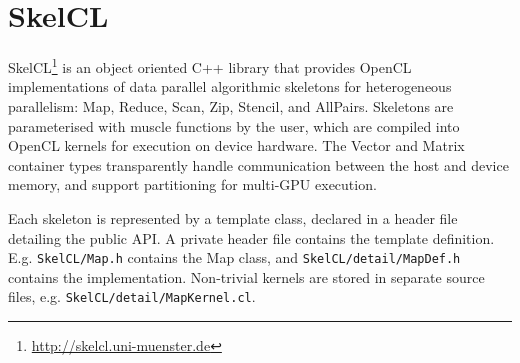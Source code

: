 %




\section{SkelCL}

SkelCL\footnote{\url{http://skelcl.uni-muenster.de}} is an object
oriented C++ library that provides OpenCL implementations of data
parallel algorithmic skeletons for heterogeneous parallelism: Map,
Reduce, Scan, Zip, Stencil, and AllPairs. Skeletons are parameterised
with muscle functions by the user, which are compiled into OpenCL
kernels for execution on device hardware. The Vector and Matrix
container types transparently handle communication between the host
and device memory, and support partitioning for multi-GPU execution.

Each skeleton is represented by a template class, declared in a header
file detailing the public API. A private header file contains the
template definition. E.g. \texttt{SkelCL/Map.h} contains the Map
class, and \texttt{SkelCL/detail/MapDef.h} contains the
implementation. Non-trivial kernels are stored in separate source
files, e.g. \texttt{SkelCL/detail/MapKernel.cl}.

